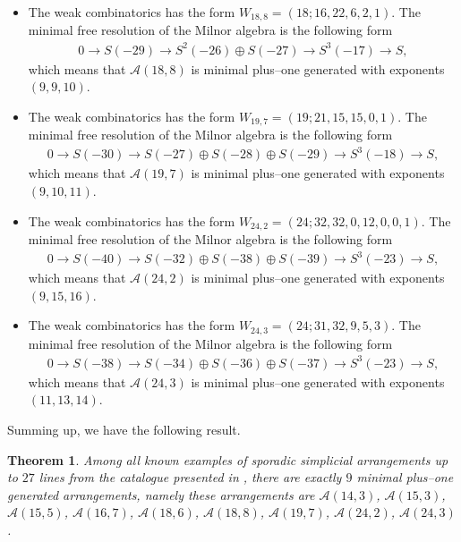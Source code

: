 \documentclass[12pt]{article}
\theoremstyle{plain}
\newtheorem{theorem}[thm]{Theorem}
\theoremstyle{definition}
\begin{document}
\begin{itemize}
   \item[$\mathcal{A}(18,8): $] The weak combinatorics has the form $W_{18,8} = (18;16,22,6,2,1)$. The minimal free resolution of the Milnor algebra is the following form
\begin{align*}
       0\rightarrow S(-29)\rightarrow S^{2}(-26)\oplus S(-27) \rightarrow S^{3}(-17) \rightarrow S,
\end{align*}
 which means that $\mathcal{A}(18,8)$ is minimal plus--one generated with exponents $(9,9,10)$.

    \item[$\mathcal{A}(19,7): $] The weak combinatorics has the form $W_{19,7} = (19;21,15,15,0,1)$. The minimal free resolution of the Milnor algebra is the following form
\begin{align*}
       0\rightarrow S(-30)\rightarrow S(-27) \oplus S(-28)\oplus S(-29) \rightarrow S^{3}(-18) \rightarrow S,
\end{align*}
 which means that $\mathcal{A}(19,7)$ is minimal plus--one generated with exponents $(9,10,11)$.

     \item[$\mathcal{A}(24,2): $] The weak combinatorics has the form $W_{24,2} = (24;32,32,0,12,0,0,1)$. The minimal free resolution of the Milnor algebra is the following form
\begin{align*}
       0\rightarrow S(-40)\rightarrow S(-32) \oplus S(-38)\oplus S(-39) \rightarrow S^{3}(-23) \rightarrow S,
\end{align*}
 which means that $\mathcal{A}(24,2)$ is minimal plus--one generated with exponents $(9,15,16)$.

      \item[$\mathcal{A}(24,3): $] The weak combinatorics has the form $W_{24,3} = (24;31,32,9,5,3)$. The minimal free resolution of the Milnor algebra is the following form
\begin{align*}
       0\rightarrow S(-38)\rightarrow S(-34) \oplus S(-36)\oplus S(-37) \rightarrow S^{3}(-23) \rightarrow S,
\end{align*}
 which means that $\mathcal{A}(24,3)$ is minimal plus--one generated with exponents $(11,13,14)$.
\end{itemize}
Summing up, we have the following result.
\begin{theorem}
\label{spog}
Among all known examples of sporadic simplicial arrangements up to $27$ lines from the catalogue presented in \cite{Cuntz}, there are exactly $9$ minimal plus--one generated arrangements, namely these arrangements are $\mathcal{A}(14,3)$, $\mathcal{A}(15,3)$, $\mathcal{A}(15,5)$, $\mathcal{A}(16,7)$, $\mathcal{A}(18,6)$, $\mathcal{A}(18,8)$, $\mathcal{A}(19,7)$, $\mathcal{A}(24,2)$, $\mathcal{A}(24,3)$.
\end{theorem}
\end{document}
